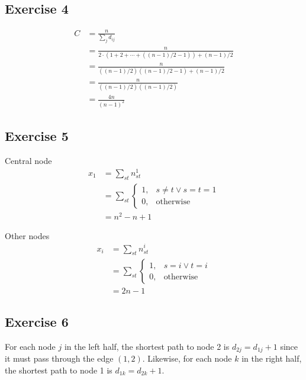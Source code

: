 \documentclass{article}
\begin{document}
\newpage

\subsection*{Exercise 4}

\begin{align*}
  C &= \frac{n}{\sum_{j} d_{ij}} \\
  &= \frac{n}{2 \cdot (1 + 2 + \dotsb + ((n - 1) / 2 - 1)) + (n - 1) / 2} \\
  &= \frac{n}{((n - 1) / 2)((n - 1) / 2 - 1) + (n - 1) / 2} \\
  &= \frac{n}{((n - 1) / 2)((n - 1) / 2)} \\
  &= \boxed{\frac{4n}{(n - 1)^2}}
\end{align*}

\newpage

\subsection*{Exercise 5}

Central node
\begin{align*}
  x_1 &= \sum_{st} n^1_{st} \\
  &= \sum_{st}
  \begin{cases}
    1, & s \ne t \lor s = t = 1 \\
    0, & \text{otherwise}
  \end{cases} \\
  &= \boxed{n^2 - n + 1}
\end{align*}

Other nodes
\begin{align*}
  x_i &= \sum_{st} n^i_{st} \\
  &= \sum_{st}
  \begin{cases}
    1, & s = i \lor t = i \\
    0, & \text{otherwise}
  \end{cases} \\
  &= \boxed{2n - 1}
\end{align*}

\newpage

\subsection*{Exercise 6}

For each node \( j \) in the left half, the shortest path to node 2 is \( d_{2j}
= d_{1j} + 1 \) since it must pass through the edge \( (1, 2) \). Likewise, for
each node \( k \) in the right half, the shortest path to node 1 is \( d_{1k} =
d_{2k} + 1 \).
\end{document}
